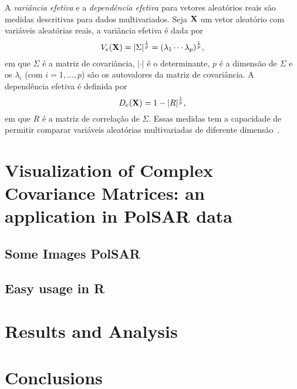 \documentclass[a4paper,12pt]{article}
\begin{document}
A \textit{variância efetiva} e a \textit{dependência efetiva} para vetores aleatórios reais são medidas descritivas para dados multivariados.  Seja ${\bf X}$ um vetor aleatório com variáveis aleatórias reais, a variância efetiva é dada por
$$V_{e}({\bf X})=\vert \Sigma \vert^{\frac{1}{p}}=(\lambda_{1}\cdots \lambda_{p})^{\frac{1}{p}},$$
em que $\Sigma$ é a matriz de covariância, $\vert \cdot \vert$ é o determinante, $p$ é a dimensão de $\Sigma$ e os $\lambda_{i}$ (com $i=1,\ldots, p$) são os autovalores da matriz de covariância. A dependência efetiva é definida por
$$D_{e}({\bf X})= 1-\vert R \vert^{\frac{1}{p}}, $$
em que $R$ é a matriz de correlação de $\Sigma$. 
Essas medidas tem a capacidade de permitir comparar variáveis aleatórias multivariadas de diferente dimensão~\citep{Pena-2003}. 

\section{Visualization of Complex Covariance Matrices: an application in Pol{SAR} data}\label{tres}

\subsection{Some Images Pol{SAR}}

\subsection{Easy usage in R}

\section{Results and Analysis}\label{quatro}

\section{Conclusions}\label{cinco}

\newpage



\end{document}
